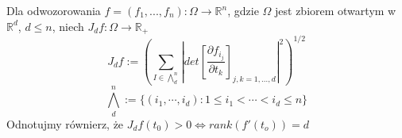 \begin{defi}
	Dla odwozorowania $f = (f_1, ..., f_n): \Omega \rightarrow \mathbb{R}^n$, gdzie $\Omega$ jest zbiorem otwartym w $\mathbb{R}^d$, $d \leq n$, niech $J_df: \Omega \rightarrow \mathbb{R}_+$ $$ 
	J_df := \left( \sum_{I \in \bigwedge_d^n} \left| det \left[ \frac{\partial f_{i_j}}{\partial t_k} \right]_{j,k=1,\dots,d} \right|^2 \right)^{1/2}
	$$
	$$
		\bigwedge_d^n := \{ (i_1, \cdots, i_d): 1 \leq i_1 < \cdots < i_d \leq n \}
	$$
	Odnotujmy równierz, że $J_df(t_0) > 0 \Leftrightarrow rank(f'(t_o))  =d$ 
\end{defi}